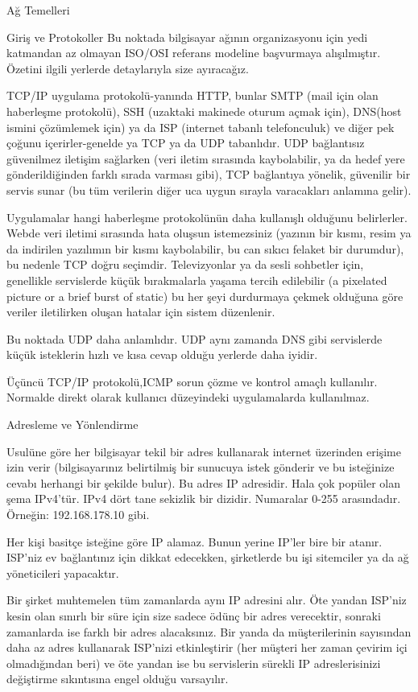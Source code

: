 \begin{section}{Ağ Temelleri}
\begin{subsection}{Giriş ve Protokoller}
Bu noktada bilgisayar ağının organizasyonu için yedi katmandan az olmayan ISO/OSI referans modeline başvurmaya alışılmıştır. Özetini ilgili yerlerde detaylarıyla size ayıracağız.

TCP/IP uygulama protokolü-yanında HTTP, bunlar SMTP (mail için olan haberleşme protokolü), SSH (uzaktaki makinede oturum açmak için), DNS(host ismini çözümlemek için) ya da ISP (internet tabanlı telefonculuk) ve diğer pek çoğunu içerirler-genelde ya TCP ya da UDP tabanlıdır. UDP bağlantısız güvenilmez iletişim sağlarken (veri iletim sırasında kaybolabilir, ya da hedef yere gönderildiğinden farklı sırada varması gibi), TCP bağlantıya yönelik, güvenilir bir servis sunar (bu tüm verilerin diğer uca uygun sırayla varacakları anlamına gelir).

Uygulamalar hangi haberleşme protokolünün daha kullanışlı olduğunu belirlerler. Webde veri iletimi sırasında hata oluşsun istemezsiniz (yazının bir kısmı, resim ya da indirilen yazılımın bir kısmı kaybolabilir, bu can sıkıcı felaket bir durumdur), bu nedenle TCP doğru seçimdir. Televizyonlar ya da sesli sohbetler için, genellikle servislerde küçük bırakmalarla yaşama tercih edilebilir (a pixelated picture or a brief burst of static) bu her şeyi durdurmaya çekmek olduğuna göre veriler iletilirken oluşan hatalar için sistem düzenlenir.

Bu noktada UDP daha anlamlıdır. UDP aynı zamanda DNS gibi servislerde küçük isteklerin hızlı ve kısa cevap olduğu yerlerde daha iyidir.

Üçüncü TCP/IP protokolü,ICMP sorun çözme ve kontrol amaçlı kullanılır. Normalde direkt olarak kullanıcı düzeyindeki uygulamalarda kullanılmaz.
\end{subsection}
\begin{subsection}{Adresleme ve Yönlendirme}

Usulüne göre her bilgisayar tekil bir adres kullanarak internet üzerinden erişime izin verir (bilgisayarınız belirtilmiş bir sunucuya istek gönderir ve bu isteğinize cevabı herhangi bir şekilde bulur). Bu adres IP adresidir. Hala çok popüler olan şema IPv4'tür. IPv4 dört tane sekizlik bir dizidir. Numaralar 0-255 arasındadır. Örneğin: 192.168.178.10 gibi. 

Her kişi basitçe isteğine göre IP alamaz. Bunun yerine IP'ler bire bir atanır. ISP'niz ev bağlantınız için dikkat edecekken, şirketlerde bu işi sitemciler ya da ağ yöneticileri yapacaktır.

Bir şirket muhtemelen tüm zamanlarda aynı IP adresini alır. Öte yandan ISP'niz kesin olan sınırlı bir süre için size sadece ödünç bir adres verecektir, sonraki zamanlarda ise farklı bir adres alacaksınız. Bir yanda da müşterilerinin sayısından daha az adres kullanarak ISP'nizi etkinleştirir (her müşteri her zaman çevirim içi olmadığından beri) ve öte yandan ise bu servislerin sürekli IP adreslerisinizi değiştirme sıkıntısına engel olduğu varsayılır.


\end{subsection}
\end{section}
